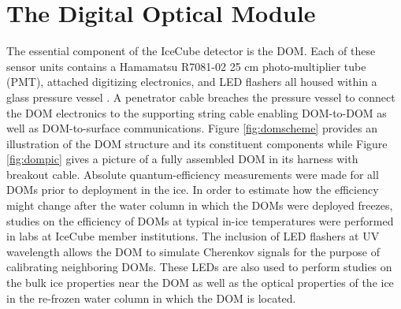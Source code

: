 \documentclass{gatech-thesis}
\begin{document}
\section{The Digital Optical Module}
The essential component of the IceCube detector is the DOM. Each of these sensor units contains a Hamamatsu R7081-02 25 cm photo-multiplier tube (PMT), attached digitizing electronics, and LED flashers all housed within a glass pressure vessel \cite{2006NIMPA.567..214H}. A penetrator cable breaches the pressure vessel to connect the DOM electronics to the supporting string cable enabling DOM-to-DOM as well as DOM-to-surface communications. Figure \ref{fig:domscheme} provides an illustration of the DOM structure and its constituent components while Figure \ref{fig:dompic} gives a picture of a fully assembled DOM in its harness with breakout cable. Absolute quantum-efficiency measurements were made for all DOMs prior to deployment in the ice. In order to estimate how the efficiency might change after the water column in which the DOMs were deployed freezes, studies on the efficiency of DOMs at typical in-ice temperatures were performed in labs at IceCube member institutions. The inclusion of LED flashers at UV wavelength allows the DOM to simulate Cherenkov signals for the purpose of calibrating neighboring DOMs. These LEDs are also used to perform studies on the bulk ice properties near the DOM as well as the optical properties of the ice in the re-frozen water column in which the DOM is located.
\end{document}
